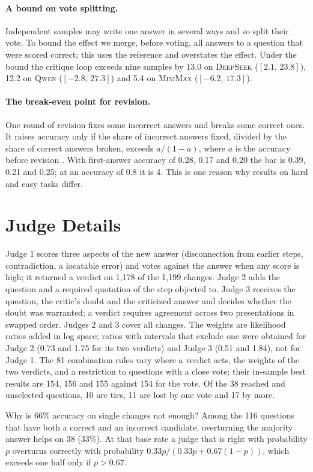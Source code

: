 \documentclass[11pt]{article}
\newcommand{\ds}{\textsc{DeepSeek}}
\newcommand{\qw}{\textsc{Qwen}}
\newcommand{\mm}{\textsc{MiniMax}}
\newcommand{\ci}[2]{$[#1,\,#2]$}
\begin{document}
\paragraph{A bound on vote splitting.}
Independent samples may write one answer in several ways and so split their vote.
To bound the effect we merge, before voting, all answers to a question that were scored correct; this uses the reference and overstates the effect.
Under the bound the critique loop exceeds nine samples by 13.0 on \ds{} (\ci{2.1}{23.8}), 12.2 on \qw{} (\ci{-2.8}{27.3}) and 5.4 on \mm{} (\ci{-6.2}{17.3}).

\paragraph{The break-even point for revision.}
One round of revision fixes some incorrect answers and breaks some correct ones.
It raises accuracy only if the share of incorrect answers fixed, divided by the share of correct answers broken, exceeds $a/(1-a)$, where $a$ is the accuracy before revision \citep{yang2024confidence}.
With first-answer accuracy of 0.28, 0.17 and 0.20 the bar is 0.39, 0.21 and 0.25; at an accuracy of 0.8 it is 4.
This is one reason why results on hard and easy tasks differ.

\section{Judge Details}
\label{app:judges}

Judge 1 scores three aspects of the new answer (disconnection from earlier steps, contradiction, a locatable error) and votes against the answer when any score is high; it returned a verdict on 1{,}178 of the 1{,}199 changes.
Judge 2 adds the question and a required quotation of the step objected to.
Judge 3 receives the question, the critic's doubt and the criticized answer and decides whether the doubt was warranted; a verdict requires agreement across two presentations in swapped order.
Judges 2 and 3 cover all changes.
The weights are likelihood ratios added in log space; ratios with intervals that exclude one were obtained for Judge 2 (0.73 and 1.75 for its two verdicts) and Judge 3 (0.51 and 1.84), not for Judge 1.
The 81 combination rules vary where a verdict acts, the weights of the two verdicts, and a restriction to questions with a close vote; their in-sample best results are 154, 156 and 155 against 154 for the vote.
Of the 38 reached and unselected questions, 10 are ties, 11 are lost by one vote and 17 by more.

Why is 66\% accuracy on single changes not enough?
Among the 116 questions that have both a correct and an incorrect candidate, overturning the majority answer helps on 38 (33\%).
At that base rate a judge that is right with probability $p$ overturns correctly with probability $0.33p/(0.33p+0.67(1-p))$, which exceeds one half only if $p>0.67$.
\end{document}
